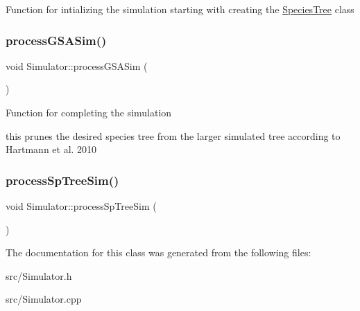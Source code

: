 Function for intializing the simulation starting with creating the \mbox{\hyperlink{class_species_tree}{Species\+Tree}} class \mbox{\label{class_simulator_a16a8faee8487c96a8a0e00db292d5029}} 
\subsubsection{\texorpdfstring{processGSASim()}{processGSASim()}}
{\footnotesize\ttfamily void Simulator\+::process\+G\+S\+A\+Sim (\begin{DoxyParamCaption}{ }\end{DoxyParamCaption})}

Function for completing the simulation

this prunes the desired species tree from the larger simulated tree according to Hartmann et al. 2010 \mbox{\label{class_simulator_ab88791e8609fa9f8076157516eb9ab1b}} 
\subsubsection{\texorpdfstring{processSpTreeSim()}{processSpTreeSim()}}
{\footnotesize\ttfamily void Simulator\+::process\+Sp\+Tree\+Sim (\begin{DoxyParamCaption}{ }\end{DoxyParamCaption})}



The documentation for this class was generated from the following files\+:\begin{DoxyCompactItemize}
\item 
src/Simulator.\+h\item 
src/Simulator.\+cpp\end{DoxyCompactItemize}
